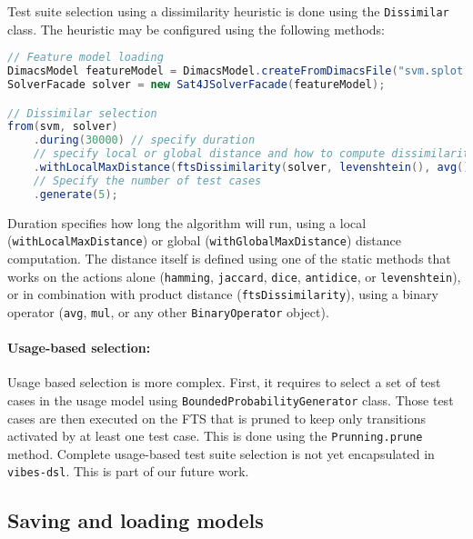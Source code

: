 Test suite selection using a dissimilarity heuristic is done using the \texttt{Dissimilar} class. The heuristic may be configured using the following methods:
%
\begin{lstlisting}[language=Java,frame=single,numbers=none]
// Feature model loading
DimacsModel featureModel = DimacsModel.createFromDimacsFile("svm.splot.dimacs");
SolverFacade solver = new Sat4JSolverFacade(featureModel);  

// Dissimilar selection
from(svm, solver)
	.during(30000) // specify duration
	// specify local or global distance and how to compute dissimilarity
	.withLocalMaxDistance(ftsDissimilarity(solver, levenshtein(), avg()))
	// Specify the number of test cases
	.generate(5);
\end{lstlisting}
%
Duration specifies how long the algorithm will run, using a local (\texttt{with\-Local\-Max\-Dis\-tance}) or global (\texttt{with\-Glo\-bal\-Max\-Dis\-tance}) distance computation. The distance itself is defined using one of the static methods that works on the actions alone (\texttt{hamming}, \texttt{jaccard}, \texttt{dice}, \texttt{antidice}, or \texttt{levenshtein}), or in combination with product distance (\texttt{fts\-Dis\-si\-mi\-la\-ri\-ty}), using a binary operator (\texttt{avg}, \texttt{mul}, or any other \texttt{Bi\-na\-ry\-Ope\-ra\-tor} object).

\paragraph{Usage-based selection:}

Usage based selection is more complex. First, it requires to select a set of test cases in the \gls{usage model} using \texttt{Boun\-ded\-Pro\-ba\-bi\-li\-ty\-Ge\-ne\-ra\-tor} class. Those test cases are then executed on the \gls{FTS} that is pruned to keep only transitions activated by at least one test case. This is done using the \texttt{Prun\-ning.pru\-ne} method. Complete usage-based test suite selection is not yet encapsulated in \texttt{vibes-dsl}. This is part of our future work.

\subsection{Saving and loading models}

